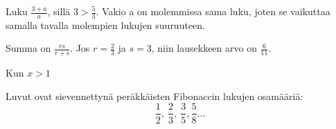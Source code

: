 \begin{Vastaus}{77}
            
\end{Vastaus}
\begin{Vastaus}{78}
	
\end{Vastaus}
\begin{Vastaus}{79}
\end{Vastaus}
\begin{Vastaus}{80}
  Luku $\frac{3+a}{a}$, sillä $3>\frac{5}{3}$. Vakio a on molemmissa sama luku, joten se vaikuttaa samalla tavalla molempien lukujen suuruuteen.
 
\end{Vastaus}
\begin{Vastaus}{81}
		Summa on $\frac{rs}{r+s}$. Jos $r=\frac{2}{3}$ ja $s=3$, niin lausekkeen arvo on $\frac{6}{11}$.
	
\end{Vastaus}
\begin{Vastaus}{82}
	
\end{Vastaus}
\begin{Vastaus}{83}
	 Kun $x>1$
	
\end{Vastaus}
\begin{Vastaus}{84}
 
\end{Vastaus}
\begin{Vastaus}{85}
		Luvut ovat sievennettynä peräkkäisten Fibonaccin lukujen osamääriä:
		\[\frac{1}{2}, \ \frac{2}{3}, \ \frac{3}{5}, \frac{5}{8} \ldots  \]
	
\end{Vastaus}
\begin{Vastaus}{86}
	
\end{Vastaus}
